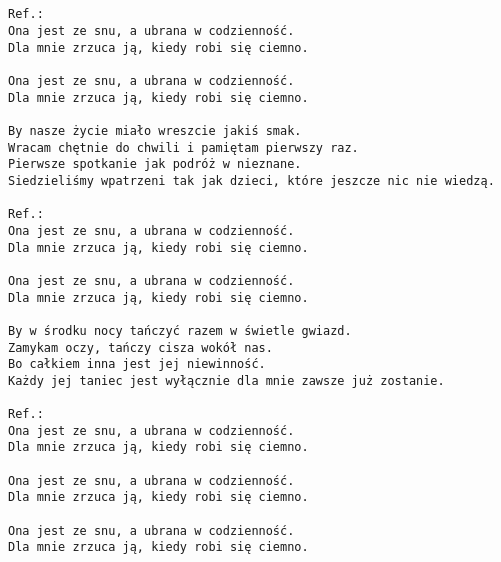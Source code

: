 \documentclass[12pt]{article}
\begin{document}
\subsection*{}
\begin{verbatim}
Ref.:
Ona jest ze snu, a ubrana w codzienność.
Dla mnie zrzuca ją, kiedy robi się ciemno.

Ona jest ze snu, a ubrana w codzienność.
Dla mnie zrzuca ją, kiedy robi się ciemno.

By nasze życie miało wreszcie jakiś smak.
Wracam chętnie do chwili i pamiętam pierwszy raz.
Pierwsze spotkanie jak podróż w nieznane.
Siedzieliśmy wpatrzeni tak jak dzieci, które jeszcze nic nie wiedzą.

Ref.:
Ona jest ze snu, a ubrana w codzienność.
Dla mnie zrzuca ją, kiedy robi się ciemno.

Ona jest ze snu, a ubrana w codzienność.
Dla mnie zrzuca ją, kiedy robi się ciemno.

By w środku nocy tańczyć razem w świetle gwiazd.
Zamykam oczy, tańczy cisza wokół nas.
Bo całkiem inna jest jej niewinność.
Każdy jej taniec jest wyłącznie dla mnie zawsze już zostanie.

Ref.:
Ona jest ze snu, a ubrana w codzienność.
Dla mnie zrzuca ją, kiedy robi się ciemno.

Ona jest ze snu, a ubrana w codzienność.
Dla mnie zrzuca ją, kiedy robi się ciemno.

Ona jest ze snu, a ubrana w codzienność.
Dla mnie zrzuca ją, kiedy robi się ciemno.
\end{verbatim}
\clearpage
\end{document}
